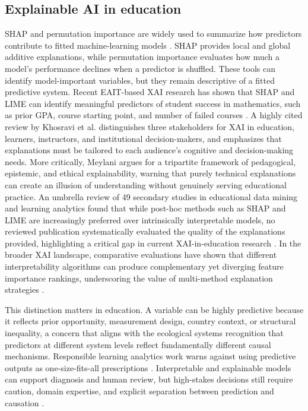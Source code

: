 \documentclass[pdflatex,sn-mathphys-ay]{sn-jnl}
\begin{document}
\FloatBarrier
\subsection{Explainable AI in education}

SHAP and permutation importance are widely used to summarize how predictors contribute to fitted machine-learning models \citep{Lundberg_Lee_2017,Molnar_2022}. SHAP provides local and global additive explanations, while permutation importance evaluates how much a model's performance declines when a predictor is shuffled. These tools can identify model-important variables, but they remain descriptive of a fitted predictive system. Recent EAIT-based XAI research has shown that SHAP and LIME can identify meaningful predictors of student success in mathematics, such as prior GPA, course starting point, and number of failed courses \citep{Mgonja_2024}. A highly cited review by Khosravi et al. \citep{Khosravi_2022} distinguishes three stakeholders for XAI in education, learners, instructors, and institutional decision-makers, and emphasizes that explanations must be tailored to each audience's cognitive and decision-making needs. More critically, Meylani \citep{Meylani_2025} argues for a tripartite framework of pedagogical, epistemic, and ethical explainability, warning that purely technical explanations can create an illusion of understanding without genuinely serving educational practice. An umbrella review of 49 secondary studies in educational data mining and learning analytics found that while post-hoc methods such as SHAP and LIME are increasingly preferred over intrinsically interpretable models, no reviewed publication systematically evaluated the quality of the explanations provided, highlighting a critical gap in current XAI-in-education research \citep{Gunasekara_Saarela_2024}. In the broader XAI landscape, comparative evaluations have shown that different interpretability algorithms can produce complementary yet diverging feature importance rankings, underscoring the value of multi-method explanation strategies \citep{Niu_2025}.

This distinction matters in education. A variable can be highly predictive because it reflects prior opportunity, measurement design, country context, or structural inequality, a concern that aligns with the ecological systems recognition that predictors at different system levels reflect fundamentally different causal mechanisms. Responsible learning analytics work warns against using predictive outputs as one-size-fits-all prescriptions \citep{Joksimovic_2020}. Interpretable and explainable models can support diagnosis and human review, but high-stakes decisions still require caution, domain expertise, and explicit separation between prediction and causation \citep{Rudin_2019,Susnjak_2022}.
\end{document}
